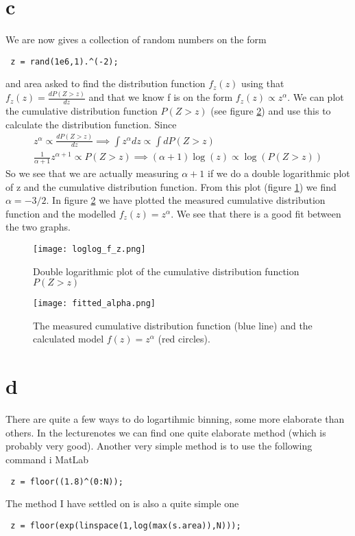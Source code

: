 \documentclass[a4paper,english, 10pt, twoside]{article}
\begin{document}
\section*{c}
We are now gives a collection of random numbers on the form
\begin{lstlisting}
 z = rand(1e6,1).^(-2);
\end{lstlisting}
and area asked to find the distribution function $f_z(z)$ using that $f_z(z) = \frac{dP(Z>z)}{dz}$ and that 
we know f is on the form $f_z(z)\propto z^\alpha$. We can plot the cumulative distribution function $P(Z>z)$ 
(see figure \ref{alpha}) and use this to calculate the distribution function. Since 
\begin{align*}
z^\alpha\propto\frac{dP(Z>z)}{dz} \implies \int z^\alpha dz \propto \int dP(Z>z)\\
\frac{1}{\alpha+1}z^{\alpha+1} \propto P(Z>z) \implies (\alpha +1)\log(z)\propto \log(P(Z>z))
\end{align*}
So we see that we are actually measuring $\alpha +1$ if we do a double logarithmic plot of z and the 
cumulative distribution function. From this plot (figure \ref{loglog_f_z}) we find $\alpha = -3/2$. In figure 
\ref{alpha} we have plotted the measured cumulative distribution function and the modelled $f_z(z) = z^\alpha$. 
We see that there is a good fit between the two graphs.

\begin{figure}[H]
 \centering
 \texttt{[image: loglog\_f\_z.png]}
 \caption{Double logarithmic plot of the cumulative distribution function $P(Z>z)$}
 \label{loglog_f_z}
\end{figure}

\begin{figure}[H]
 \centering
 \texttt{[image: fitted\_alpha.png]}
  \caption{The measured cumulative distribution function (blue line) and the calculated model $f(z) = z^\alpha$ (red circles).}
 \label{alpha}
\end{figure}

\section*{d}

There are quite a few ways to do logartihmic binning, some more elaborate than others. In the lecturenotes 
we can find one quite elaborate method (which is probably very good). Another very simple method is to use 
the following command i MatLab
\begin{lstlisting}
 z = floor((1.8)^(0:N));
\end{lstlisting}
The method I have settled on is also a quite simple one
\begin{lstlisting}
 z = floor(exp(linspace(1,log(max(s.area)),N)));
\end{lstlisting}
\end{document}
